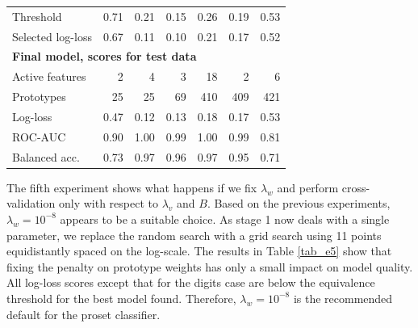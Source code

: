 \begin{table}
\begin{center}
\begin{tabular}{|lrrrrrr|}
Threshold&0.71&0.21&0.15&0.26&0.19&0.53\\
Selected log-loss&0.67&0.11&0.10&0.21&0.17&0.52\\
\multicolumn{7}{|l|}{\textbf{Final model, scores for test data}}\\
Active features&2&4&3&18&2&6\\
Prototypes&25&25&69&410&409&421\\
Log-loss&0.47&0.12&0.13&0.18&0.17&0.53\\
ROC-AUC&0.90&1.00&0.99&1.00&0.99&0.81\\
Balanced acc.&0.73&0.97&0.96&0.97&0.95&0.71\\
\hline
\end{tabular}
\end{center}
\end{table}
%
The fifth experiment shows what happens if we fix $\lambda_w$ and perform cross-validation only with respect to $\lambda_v$ and $B$.
Based on the previous experiments, $\lambda_w=10^{-8}$ appears to be a suitable choice.
As stage 1 now deals with a single parameter, we replace the random search with a grid search using 11 points equidistantly spaced on the log-scale.
The results in Table \ref{tab_e5} show that fixing the penalty on prototype weights has only a small impact on model quality.
All log-loss scores except that for the digits case are below the equivalence threshold for the best model found.
Therefore, $\lambda_w=10^{-8}$ is the recommended default for the proset classifier.\par
%
\clearpage
%

